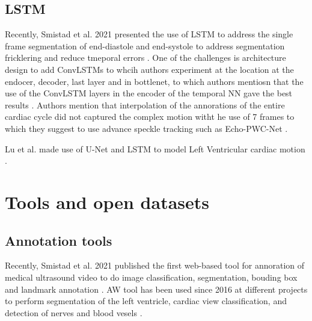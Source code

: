 



\subsection{LSTM}
Recently, Smistad et al. 2021 presented the use of LSTM to address the single frame segmentation of end-diastole and end-systole to address segmentation fricklering and reduce tmeporal errors \cite{smistad2021-C-IUS}.
One of the challenges is architecture design to add ConvLSTMs to whcih authors experiment at the location at the endocer, decoder, last layer and in bottlenet, to which authors mentiosn that the use of the ConvLSTM layers in the encoder of the temporal NN gave the best results \cite{smistad2021-C-IUS}.
Authors mention that interpolation of the annorations of the entire cardiac cycle did not captured the complex motion witht he use of 7 frames to which they suggest to use advance speckle tracking such as Echo-PWC-Net  \cite{ostvik2021-TMI}.

Lu et al. made use of U-Net and LSTM to model Left Ventricular cardiac motion \cite{lu2020-MIUA}.




\section{Tools and open datasets}

\subsection{Annotation tools}
Recently, Smistad et al. 2021 published the first web-based tool for annoration of medical ultrasound video to do image classification, segmentation, bouding box and landmark annotation  \cite{smistad2021-A-IUS}. 
AW tool has been used since 2016 at different projects to perform segmentation of the left ventricle, cardiac view classification, and detection of nerves and blood vesels
\cite{smistad2021-A-IUS}.

